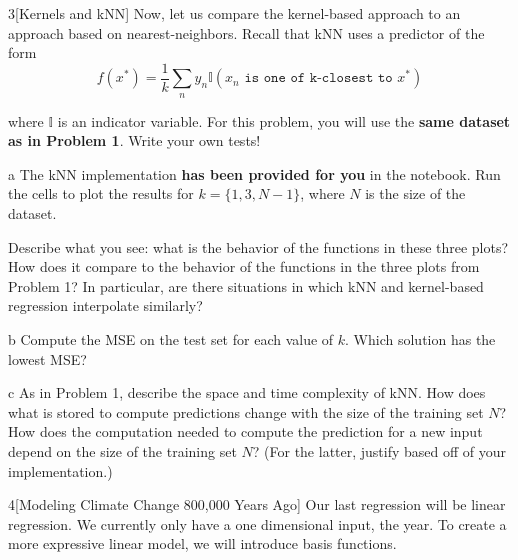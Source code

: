 \documentclass[expanded]{pset}
\begin{document}
\begin{problem}{3}[Kernels and kNN]
  Now, let us compare the kernel-based approach to an approach based on
  nearest-neighbors.  Recall that kNN uses a predictor of the form
  \begin{equation*}
    f(x^*) = \frac{1}{k} \sum_n y_n \mathbb{I}(x_n \texttt{ is one of k-closest to } x^*)
  \end{equation*}

  \noindent where $\mathbb{I}$ is an indicator variable. For this problem, you will use the \textbf{same dataset as in Problem 1}. Write your own tests!
\end{problem}

\begin{parts}
  \begin{part}{a}
    The kNN implementation \textbf{has been provided for you} in the notebook. Run the cells to plot the results for $k=\{1, 3, N-1\}$, where $N$ is the size of the dataset.

    Describe what you see: what is the behavior of the functions in
    these three plots?  How does it compare to the behavior of the
    functions in the three plots from Problem 1? In particular, are
    there situations in which kNN and kernel-based regression
    interpolate similarly?
  \end{part}

  \begin{part}{b}
    Compute the MSE on the test set for each value of $k$.  Which solution has the lowest MSE?  
  \end{part}

  \begin{part}{c}
    As in Problem 1, describe the space and time complexity of kNN.  How does what is stored to compute predictions change with the size of the training set $N$?  How does the computation needed to compute the prediction for a new input depend on the size of the training set $N$? (For the latter, justify based off of your implementation.)
  \end{part}
\end{parts}

\begin{problem}{4}[Modeling Climate Change 800,000 Years Ago]
Our last regression will be linear regression.  We currently only have
a one dimensional input, the year.  To create a more expressive linear
model, we will introduce basis functions.
\end{problem}
\end{document}

